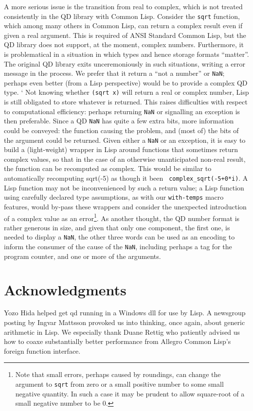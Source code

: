 \documentclass{article}
\begin{document}
A more serious issue
is the transition from real to complex, which
is not treated consistently in the QD library
with Common Lisp. Consider the {\tt sqrt} function, which among
many others in Common Lisp, can return a complex result even if given a real argument.  This 
is required of ANSI Standard Common Lisp, but the QD library does not support, at the moment,
complex numbers.  Furthermore, it is problematical in a situation in which
types and hence storage formats ``matter''. The original QD library exits
unceremoniously in such situations, writing a error message
in the process. We prefer that it return a ``not a number''
or {\tt NaN};  perhaps even better (from a Lisp perspective) would be to 
provide a complex QD type.  `
Not knowing whether
{\tt (sqrt x)} will return a real or complex number, Lisp is still obligated to
store whatever is returned. This raises difficulties with respect to
computational efficiency: perhaps returning {\tt NaN}
or signalling an exception is then preferable. Since a QD {\tt NaN} has quite
a few extra bits, more information could be conveyed: the function causing
the problem, and (most of) the bits of the argument could be returned.
Given either a {\tt NaN} or an exception, it is easy to build a
(light-weight) wrapper in Lisp around functions that sometimes return
complex values, so that in the case of an otherwise unanticipated
non-real result, the function can be recomputed as complex.  This would be similar
to automatically recomputing  sqrt(-5) as though it been {\verb| complex_sqrt(-5+0*i)|}.
A Lisp function may not be inconvenienced by such a return value;
a Lisp function using carefully declared type assumptions, as with
our {\tt with-temps} macro features, would by-pass these wrappers and
consider the unexpected introduction of a complex value as an error\footnote
{Note that small errors, perhaps caused by roundings, can change the argument
to {\tt sqrt}  from zero or a small positive number
to some small negative quantity. In such a case it
may be prudent to allow square-root of a small negative number to be 0.}.
As another thought, the QD number format is rather generous in size, and given
that only one component, the first one, is needed to display a {\tt NaN}, the
other three words can be used as an encoding to inform the consumer of the cause of the
{\tt NaN}, including perhaps a tag for the program counter, and one or more of the
arguments.

\section{Acknowledgments}
Yozo Hida helped get qd running in a Windows dll for use by Lisp.  A
newsgroup posting by Ingvar Mattsson provoked us into thinking, once
again, about generic arithmetic in Lisp.  We especially thank Duane
Rettig who patiently advised us how to coaxe substantially better
performance from Allegro Common Lisp's foreign function interface.
\end{document}

